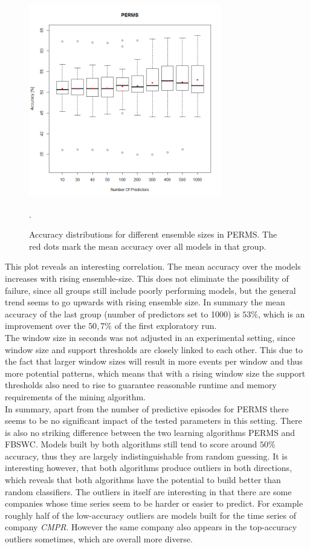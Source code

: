 \begin{figure}[h]
	\centering
  	\includegraphics[width=0.75\textwidth]{permsNumPredictors}
	\caption{Accuracy distributions for different ensemble sizes in PERMS. The red dots mark the mean accuracy over all models in that group.}.
	\label{fig_permsNumPredictors}
\end{figure}

This plot reveals an interesting correlation. The mean accuracy over the models increases with rising ensemble-size. This does not eliminate the possibility of failure, since all groups still include poorly performing models, but the general trend seems to go upwards with rising ensemble size. In summary the mean accuracy of the last group (number of predictors set to 1000) is $53\%$, which is an improvement over the $50,7\%$ of the first exploratory run. \\
The window size in seconds was not adjusted in an experimental setting, since window size and support thresholds are closely linked to each other. This due to the fact that larger window sizes will result in more events per window and thus more potential patterns, which means that with a rising window size the support thresholds also need to rise to guarantee reasonable runtime and memory requirements of the mining algorithm. \\
In summary, apart from the number of predictive episodes for PERMS there seems to be no significant impact of the tested parameters in this setting. There is also no striking difference between the two learning algorithms PERMS and FBSWC. Models built by both algorithms still tend to score around $50\%$ accuracy, thus they are largely indistinguishable from random guessing. It is interesting however, that both algorithms produce outliers in both directions, which reveals that both algorithms have the potential to build better than random classifiers. The outliers in itself are interesting in that there are some companies whose time series seem to be harder or easier to predict. For example roughly half of the low-accuracy outliers are models built for the time series of company \textit{CMPR}. However the same company also appears in the top-accuracy outliers sometimes, which are overall more diverse.

